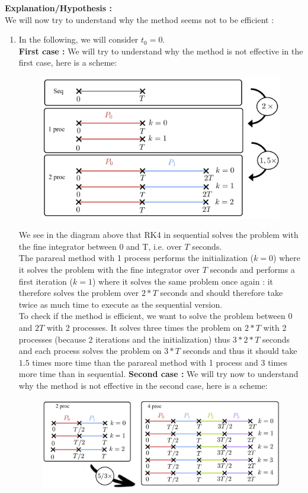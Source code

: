 \noindent \textbf{Explanation/Hypothesis :} \\
We will now try to understand why the method seems not to be efficient :
\begin{enumerate}[label=\textbullet]
	\item In the following, we will consider $t_0=0$. \\
	\textbf{First case :} We will try to understand why the method is not effective in the first case, here is a scheme: 
	\begin{figure}[H]      
		\centering
		\includegraphics[width=0.5\linewidth]{"images/parareal/cpp/efficient_1_vs_2.jpg"}
		\label{efficient_1_vs_2}
	\end{figure}
	We see in the diagram above that RK4 in sequential solves the problem with the fine integrator between 0 and T, i.e. over $T$ seconds. \\
	The parareal method with 1 process performs the initialization ($k=0$) where it solves the problem with the fine integrator over $T$ seconds and performs a first iteration ($k=1$) where it solves the same problem once again : it therefore solves the problem over $2*T$ seconds and should therefore take twice as much time to execute as the sequential version. \\
	To check if the method is efficient, we want to solve the problem between 0 and $2T$ with 2 processes.  It solves three times the problem on $2*T$ with 2 processes (because 2 iterations and the initialization) thus $3*2*T$ seconds and each process solves the problem on $3*T$ seconds and thus it should take $1.5$ times more time than the parareal method with 1 process and $3$ times more time than in sequential.
	\textbf{Second case :} We will try now to understand why the method is not effective in the second case, here is a scheme: 
	\begin{figure}[H]      
		\qquad \qquad \qquad
		\includegraphics[width=0.7\linewidth]{"images/parareal/cpp/efficient_2p_vs_4p.jpg"}

\end{figure}
\end{enumerate}
